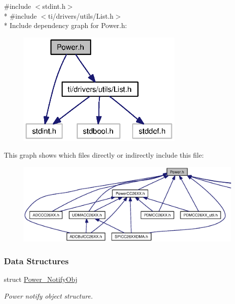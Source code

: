 {\ttfamily \#include $<$stdint.\+h$>$}\\*
{\ttfamily \#include $<$ti/drivers/utils/\+List.\+h$>$}\\*
Include dependency graph for Power.\+h\+:
\nopagebreak
\begin{figure}[H]
\begin{center}
\leavevmode
\includegraphics[width=231pt]{_power_8h__incl}
\end{center}
\end{figure}
This graph shows which files directly or indirectly include this file\+:
\nopagebreak
\begin{figure}[H]
\begin{center}
\leavevmode
\includegraphics[width=350pt]{_power_8h__dep__incl}
\end{center}
\end{figure}
\subsubsection*{Data Structures}
\begin{DoxyCompactItemize}
\item 
struct \hyperlink{struct_power___notify_obj}{Power\+\_\+\+Notify\+Obj}
\begin{DoxyCompactList}\small\item\em Power notify object structure. \end{DoxyCompactList}\end{DoxyCompactItemize}
